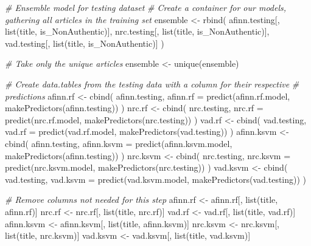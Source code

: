 \documentclass[
]{article}
\newenvironment{Shaded}{\begin{snugshade}}{\end{snugshade}}
\newcommand{\AttributeTok}[1]{\textcolor[rgb]{0.77,0.63,0.00}{#1}}
\newcommand{\CommentTok}[1]{\textcolor[rgb]{0.56,0.35,0.01}{\textit{#1}}}
\newcommand{\FunctionTok}[1]{\textcolor[rgb]{0.00,0.00,0.00}{#1}}
\newcommand{\NormalTok}[1]{#1}
\newcommand{\OtherTok}[1]{\textcolor[rgb]{0.56,0.35,0.01}{#1}}
\begin{document}
\begin{Shaded}
\begin{Highlighting}[]
\CommentTok{\# Ensemble model for testing dataset}
\CommentTok{\# Create a container for our models, gathering all articles in the training set}
\NormalTok{ensemble }\OtherTok{\textless{}{-}} \FunctionTok{rbind}\NormalTok{(}
\NormalTok{  afinn.testing[, }\FunctionTok{list}\NormalTok{(title, is\_NonAuthentic)],}
\NormalTok{  nrc.testing[, }\FunctionTok{list}\NormalTok{(title, is\_NonAuthentic)],}
\NormalTok{  vad.testing[, }\FunctionTok{list}\NormalTok{(title, is\_NonAuthentic)]}
\NormalTok{)}

\CommentTok{\# Take only the unique articles}
\NormalTok{ensemble }\OtherTok{\textless{}{-}} \FunctionTok{unique}\NormalTok{(ensemble)}

\CommentTok{\# Create data.tables from the testing data with a column for their respective}
\CommentTok{\# predictions}
\NormalTok{afinn.rf }\OtherTok{\textless{}{-}} \FunctionTok{cbind}\NormalTok{(}
\NormalTok{  afinn.testing,}
  \AttributeTok{afinn.rf =} \FunctionTok{predict}\NormalTok{(afinn.rf.model, }\FunctionTok{makePredictors}\NormalTok{(afinn.testing))}
\NormalTok{)}
\NormalTok{nrc.rf }\OtherTok{\textless{}{-}} \FunctionTok{cbind}\NormalTok{(}
\NormalTok{  nrc.testing,}
  \AttributeTok{nrc.rf =} \FunctionTok{predict}\NormalTok{(nrc.rf.model, }\FunctionTok{makePredictors}\NormalTok{(nrc.testing))}
\NormalTok{)}
\NormalTok{vad.rf }\OtherTok{\textless{}{-}} \FunctionTok{cbind}\NormalTok{(}
\NormalTok{  vad.testing,}
  \AttributeTok{vad.rf =} \FunctionTok{predict}\NormalTok{(vad.rf.model, }\FunctionTok{makePredictors}\NormalTok{(vad.testing))}
\NormalTok{)}
\NormalTok{afinn.ksvm }\OtherTok{\textless{}{-}} \FunctionTok{cbind}\NormalTok{(}
\NormalTok{  afinn.testing,}
  \AttributeTok{afinn.ksvm =} \FunctionTok{predict}\NormalTok{(afinn.ksvm.model, }\FunctionTok{makePredictors}\NormalTok{(afinn.testing))}
\NormalTok{)}
\NormalTok{nrc.ksvm }\OtherTok{\textless{}{-}} \FunctionTok{cbind}\NormalTok{(}
\NormalTok{  nrc.testing,}
  \AttributeTok{nrc.ksvm =} \FunctionTok{predict}\NormalTok{(nrc.ksvm.model, }\FunctionTok{makePredictors}\NormalTok{(nrc.testing))}
\NormalTok{)}
\NormalTok{vad.ksvm }\OtherTok{\textless{}{-}} \FunctionTok{cbind}\NormalTok{(}
\NormalTok{  vad.testing,}
  \AttributeTok{vad.ksvm =} \FunctionTok{predict}\NormalTok{(vad.ksvm.model, }\FunctionTok{makePredictors}\NormalTok{(vad.testing))}
\NormalTok{)}

\CommentTok{\# Remove columns not needed for this step}
\NormalTok{afinn.rf }\OtherTok{\textless{}{-}}\NormalTok{ afinn.rf[, }\FunctionTok{list}\NormalTok{(title, afinn.rf)]}
\NormalTok{nrc.rf }\OtherTok{\textless{}{-}}\NormalTok{ nrc.rf[, }\FunctionTok{list}\NormalTok{(title, nrc.rf)]}
\NormalTok{vad.rf }\OtherTok{\textless{}{-}}\NormalTok{ vad.rf[, }\FunctionTok{list}\NormalTok{(title, vad.rf)]}
\NormalTok{afinn.ksvm }\OtherTok{\textless{}{-}}\NormalTok{ afinn.ksvm[, }\FunctionTok{list}\NormalTok{(title, afinn.ksvm)]}
\NormalTok{nrc.ksvm }\OtherTok{\textless{}{-}}\NormalTok{ nrc.ksvm[, }\FunctionTok{list}\NormalTok{(title, nrc.ksvm)]}
\NormalTok{vad.ksvm }\OtherTok{\textless{}{-}}\NormalTok{ vad.ksvm[, }\FunctionTok{list}\NormalTok{(title, vad.ksvm)]}


\end{Highlighting}
\end{Shaded}
\end{document}
